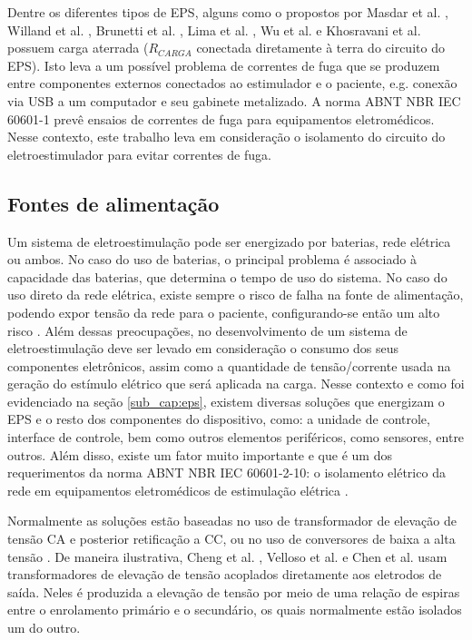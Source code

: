 Dentre os diferentes tipos de \acrshort{EPS}, alguns como o propostos por Masdar et al. \cite{Masdar2013CurrentStimulation}, Willand et al. \cite{Willand2008DesignFES.}, Brunetti et al. \cite{Brunetti2011EnhancingProject}, Lima et al. \cite{DeLima2002AControl}, Wu et al. \cite{Wu2002AApplications} e Khosravani et al. \cite{KhosravaniSanaz2011DevelopingSystem} possuem carga aterrada ($R_{CARGA}$ conectada diretamente à terra do circuito do \acrshort{EPS}). Isto leva a um possível problema de correntes de fuga que se produzem entre componentes externos conectados ao estimulador e o paciente, e.g. conexão via \acrshort{USB} a um computador e seu gabinete metalizado. A norma \acrshort{ABNT} \acrshort{NBR} \acrshort{IEC} 60601-1 prevê ensaios de correntes de fuga para equipamentos eletromédicos. Nesse contexto, este trabalho leva em consideração o isolamento do circuito do eletroestimulador para evitar correntes de fuga.

\subsection{Fontes de alimentação}
Um sistema de eletroestimulação pode ser energizado por baterias, rede elétrica ou ambos. No caso do uso de baterias, o principal problema é associado à capacidade das baterias, que determina o tempo de uso do sistema. No caso do uso direto da rede elétrica, existe sempre o risco de falha na fonte de alimentação, podendo expor tensão da rede para o paciente, configurando-se então um alto risco \cite{Gaiotto2012EstimuladorEletricamente}. Além dessas preocupações, no desenvolvimento de um sistema de eletroestimulação deve ser levado em consideração o consumo dos seus componentes eletrônicos, assim como a quantidade de tensão/corrente usada na geração do estímulo elétrico que será aplicada na carga. Nesse contexto e como foi evidenciado na seção \ref{sub_cap:eps}, existem diversas soluções que energizam o \acrshort{EPS} e o resto dos componentes do dispositivo, como: a unidade de controle, interface de controle, bem como outros elementos periféricos, como sensores, entre outros. Além disso, existe um fator muito importante e que é um dos requerimentos da norma \acrshort{ABNT} \acrshort{NBR} \acrshort{IEC} 60601-2-10: o isolamento elétrico da rede em equipamentos eletromédicos de estimulação elétrica \cite{Braz2003SistemaNeuromuscular}. 

Normalmente as soluções estão baseadas no uso de transformador de elevação de tensão \acrshort{CA} e posterior retificação a \acrshort{CC}, ou no uso de conversores de baixa a alta tensão \cite{Cheng2004DevelopmentStimulation, KhosravaniSanaz2011DevelopingSystem, Kaczmarek1991ASystem}. De maneira ilustrativa, Cheng et al. \cite{Cheng2004DevelopmentStimulation}, Velloso et al. \cite{Velloso2007AFES} e Chen et al. \cite{Chen2013ADataset} usam transformadores de elevação de tensão acoplados diretamente aos eletrodos de saída. Neles é produzida a elevação de tensão por meio de uma relação de espiras entre o enrolamento primário e o secundário, os quais normalmente estão isolados um do outro.

